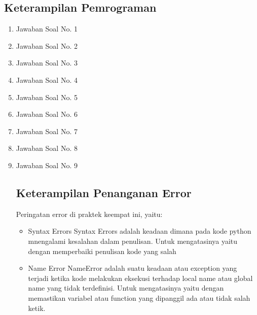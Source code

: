 \subsection{Keterampilan Pemrograman}
\begin{enumerate}

\item Jawaban Soal No. 1


\item Jawaban Soal No. 2


\item Jawaban Soal No. 3


\item Jawaban Soal No. 4


\item Jawaban Soal No. 5


\item Jawaban Soal No. 6


\item Jawaban Soal No. 7


\item Jawaban Soal No. 8


\item Jawaban Soal No. 9


\subsection{Keterampilan Penanganan Error}

Peringatan error di praktek keempat ini, yaitu:
\begin{itemize}
\item Syntax Errors
Syntax Errors adalah keadaan dimana pada kode python mnengalami kesalahan dalam penulisan. Untuk mengatasinya yaitu dengan memperbaiki penulisan kode yang salah 

\item Name Error
NameError adalah suatu keadaan atau exception yang terjadi ketika kode melakukan eksekusi terhadap local name atau global name yang tidak terdefinisi. Untuk mengatasinya yaitu dengan memastikan variabel atau function yang dipanggil ada atau tidak salah ketik.


\end{itemize}
\end{enumerate}
